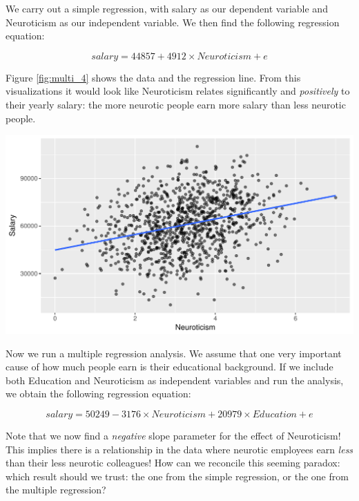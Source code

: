 \documentclass[]{report}\usepackage[]{graphicx}\usepackage[]{color}
\makeatletter
\def\maxwidth{ %
  \ifdim\Gin@nat@width>\linewidth
    \linewidth
  \else
    \Gin@nat@width
  \fi
}
\newenvironment{knitrout}{}{} %
\makeatother
\begin{document}
We carry out a simple regression, with salary as our dependent variable and Neuroticism as our independent variable. We then find the following regression equation:







\begin{equation}
salary = 44857 + 4912 \times Neuroticism + e
\end{equation}


Figure \ref{fig:multi_4} shows the data and the regression line. From this visualizations it would look like Neuroticism relates significantly and \textit{positively} to their yearly salary: the more neurotic people earn more salary than less neurotic people.



\begin{knitrout}
\color{fgcolor}

{\centering \includegraphics[width=\maxwidth]{figure/multi_4-1} 

}



\end{knitrout}

Now we run a multiple regression analysis. We assume that one very important cause of how much people earn is their educational background. If we include both Education and Neuroticism as independent variables and run the analysis, we obtain the following regression equation:

\begin{equation}
salary = 50249  -3176 \times Neuroticism + 20979 \times Education + e
\end{equation}

Note that we now find a \textit{negative} slope parameter for the effect of Neuroticism! This implies there is a relationship in the data where neurotic employees earn \textit{less} than their less neurotic colleagues! How can we reconcile this seeming paradox: which result should we trust: the one from the simple regression, or the one from the multiple regression?
\end{document}
